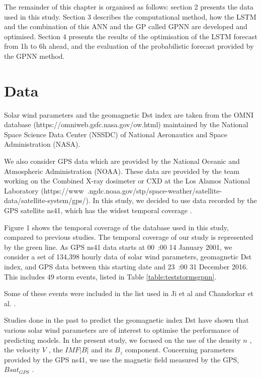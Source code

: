 The remainder of this chapter is organised as follows: section 2 presents the data used in this study. 
Section 3 describes the computational method, how the LSTM and the combination of this ANN and the GP called 
GPNN are developed and optimised. Section 4 presents the results of the optimisation of the LSTM forecast 
from 1h to 6h ahead, and the evaluation of the probabilistic forecast provided by the GPNN method. 

\section{Data}

Solar wind parameters and the geomagnetic Dst index are taken from the OMNI database 
(https://omniweb.gsfc.nasa.gov/ow.html) maintained by the National Space Science Data Center (NSSDC) 
of National Aeronautics and Space Administration (NASA).

We also consider GPS data which are provided by the National Oceanic and Atmospheric Administration (NOAA). 
These data are provided by the team working on the Combined X-ray dosimeter or CXD at the 
Los Alamos National Laboratory (https://www .ngdc.noaa.gov/stp/space-weather/satellite-data/satellite-system/gps/). 
In this study, we decided to use data recorded by the GPS satellite ns41, which has the widest temporal coverage 
\citet{morley2017energetic}. 

Figure 1 shows the temporal coverage of the database used in this study, compared to previous studies. 
The temporal coverage of our study is represented by the green line. As GPS ns41 data starts at 
00 :00 14 January 2001, we consider a set of 134,398 hourly data of solar wind parameters, geomagnetic Dst index, 
and GPS data between this starting date and 23 :00 31 December 2016. This includes 49 storm events, listed in 
Table \ref{table:teststormsgpnn}. 

Some of these events were included in the list used in Ji et al \citet{Ji2012} and 
Chandorkar et al. \citet{ChandorkarDst}. 

Studies done in the past to predict the geomagnetic index Dst have shown that various solar wind parameters 
are of interest to optimise the performance of predicting models. In the present study, we focused on the use 
of the density  \( n \) , the velocity  \( V \) , the  \( IMF \vert B \vert  \) and its  \( B_{z} \)  component. 
Concerning parameters provided by the GPS ns41, we use the magnetic field measured by the GPS,  \( Bsat_{GPS} \) .

